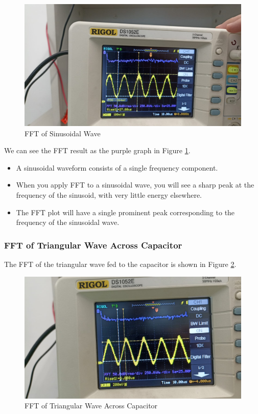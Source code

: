 \begin{figure}[h]
    \centering
    \includegraphics[width=1\textwidth]{assets/sinusodial-fft.jpeg}
    \caption{FFT of Sinusoidal Wave}
    \label{fig:sinusoidal-fft}
\end{figure}

We can see the FFT result as the purple graph in Figure \ref{fig:sinusoidal-fft}.

\begin{itemize}
    \item A sinusoidal waveform consists of a single frequency component.
    \item When you apply FFT to a sinusoidal wave, you will see a sharp peak at the frequency of the sinusoid, with very little energy elsewhere.
    \item The FFT plot will have a single prominent peak corresponding to the frequency of the sinusoidal wave.
\end{itemize}

\newpage
\thispagestyle{plain}

\subsubsection{FFT of Triangular Wave Across Capacitor}
The FFT of the triangular wave fed to the capacitor is shown in Figure \ref{fig:triangular-fft-capacitor}.

\begin{figure}[h]
    \centering
    \includegraphics[width=1\textwidth]{assets/triangular-fft-capacitor.jpg}
    \caption{FFT of Triangular Wave Across Capacitor}
    \label{fig:triangular-fft-capacitor}
\end{figure}

